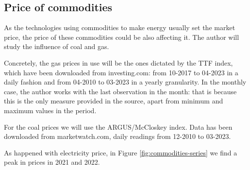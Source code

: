 \subsection{Price of commodities}
As the technologies using commodities to make energy usually set the market price, the price of these commodities could be also affecting it.
The author will study the influence of coal and gas.

Concretely, the gas prices in use will be the ones dictated by the TTF index, which have been downloaded from investing.com: from 10-2017 to 04-2023 in a daily fashion and from 04-2010 to 03-2023 in a yearly granularity. In the monthly case, the author works with the last observation in the month: that is because this is the only measure provided in the source, apart from minimum and maximum values in the period.

For the coal prices we will use the ARGUS/McCloskey index. Data has been downloaded from marketwatch.com, daily readings from 12-2010 to 03-2023.

As happened with electricity price, in Figure \ref{fig:commodities-series} we find a peak in prices in 2021 and 2022.

